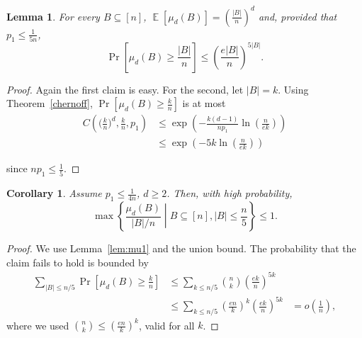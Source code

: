 \documentclass[10pt,conference,letterpaper]{IEEEtran}
\DeclareMathOperator*{\expect}{\mathbb{E}}
\newtheorem{lemma}[theorem]{Lemma}
\newtheorem{corollary}[theorem]{Corollary}
\begin{document}
\begin{lemma}\label{lem:mu2}
For every $B \subseteq [n]$,
     $\expect [\mu_d(B)]= \left(\frac{|B|}{n}\right)^d$
and, provided that $p_1 \le \frac{1}{5 n}$,
       $$ \Pr \left[ \mu_d(B) \ge \frac{|B|}{n} \right]  \le \left(\frac{e |B|}{n}\right)^{5 |B|}. $$
\end{lemma}
\begin{proof}
Again the first claim is easy. For the second, let $|B| = k$. Using Theorem~\ref{chernoff},
$\Pr \left[ \mu_d(B) \ge \frac{k}{n} \right]$ is at most
\begin{align*}
 C\left(\Big(\frac{k}{n}\Big)^d, \frac{k}{n}, p_1\right)
                                            &\le \exp\left(-\frac{k (d - 1)}{n p_1} \ln \left(\frac{n}{e k}\right) \right) \\
                                            &\le \exp\left(-5 k \ln \left(\frac{n}{e k}\right)\right)
\end{align*}    
    
since $n p_1 \le \frac{1}{5}$.
\end{proof}

\begin{corollary}\label{coro:mu2}
Assume $p_1 \le \frac{1}{4n}$, $d \ge 2$.  Then, with high probability, 
       $$ \max \left\{ \frac{\mu_d(B)}{|B| / n} \middle| B \subseteq [n], |B| \le \frac{n}{5} \right\} \le 1.$$
\end{corollary}
\begin{proof}
We use Lemma~\ref{lem:mu1} and the union bound. The probability that the claim fails to hold is bounded by
\begin{align*}
 \sum_{|B| \le n / 5} \Pr \left[ \mu_d(B) \ge \frac{k}{n} \right] &\le \sum_{k \le n/5} \binom{n}{k} \left(\frac{e k}{n}\right)^{5k} \\
                                                                  &\le \sum_{k \le n/5} \left(\frac{e n}{k}\right)^k \left(\frac{e k}{n}\right)^{5k}  
                                                                  &=o\left(\frac{1}{n}\right),
\end{align*}                                                                  
where we used  $\binom{n}{k} \le \left(\frac{e n}{k}\right)^k$, valid for all $k$.
\end{proof}
\end{document}
